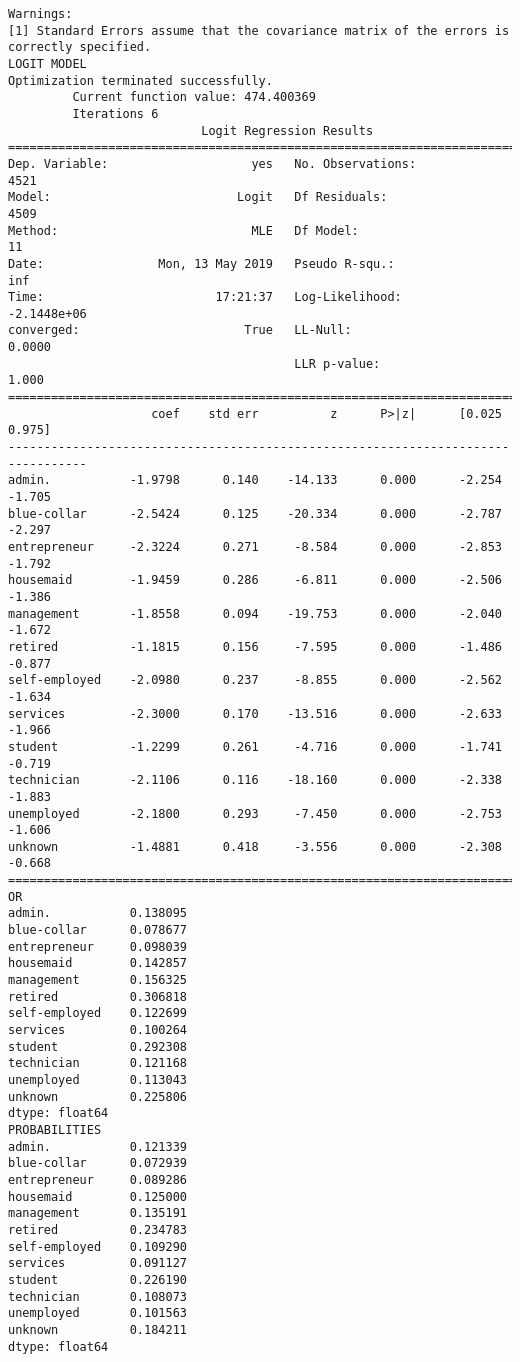 \documentclass[11pt]{article}
\begin{document}
\begin{Verbatim}[commandchars=\\\{\}]
Warnings:
[1] Standard Errors assume that the covariance matrix of the errors is correctly specified.
LOGIT MODEL
Optimization terminated successfully.
         Current function value: 474.400369
         Iterations 6
                           Logit Regression Results                           
==============================================================================
Dep. Variable:                    yes   No. Observations:                 4521
Model:                          Logit   Df Residuals:                     4509
Method:                           MLE   Df Model:                           11
Date:                Mon, 13 May 2019   Pseudo R-squ.:                     inf
Time:                        17:21:37   Log-Likelihood:            -2.1448e+06
converged:                       True   LL-Null:                        0.0000
                                        LLR p-value:                     1.000
=================================================================================
                    coef    std err          z      P>|z|      [0.025      0.975]
---------------------------------------------------------------------------------
admin.           -1.9798      0.140    -14.133      0.000      -2.254      -1.705
blue-collar      -2.5424      0.125    -20.334      0.000      -2.787      -2.297
entrepreneur     -2.3224      0.271     -8.584      0.000      -2.853      -1.792
housemaid        -1.9459      0.286     -6.811      0.000      -2.506      -1.386
management       -1.8558      0.094    -19.753      0.000      -2.040      -1.672
retired          -1.1815      0.156     -7.595      0.000      -1.486      -0.877
self-employed    -2.0980      0.237     -8.855      0.000      -2.562      -1.634
services         -2.3000      0.170    -13.516      0.000      -2.633      -1.966
student          -1.2299      0.261     -4.716      0.000      -1.741      -0.719
technician       -2.1106      0.116    -18.160      0.000      -2.338      -1.883
unemployed       -2.1800      0.293     -7.450      0.000      -2.753      -1.606
unknown          -1.4881      0.418     -3.556      0.000      -2.308      -0.668
=================================================================================
OR
admin.           0.138095
blue-collar      0.078677
entrepreneur     0.098039
housemaid        0.142857
management       0.156325
retired          0.306818
self-employed    0.122699
services         0.100264
student          0.292308
technician       0.121168
unemployed       0.113043
unknown          0.225806
dtype: float64
PROBABILITIES
admin.           0.121339
blue-collar      0.072939
entrepreneur     0.089286
housemaid        0.125000
management       0.135191
retired          0.234783
self-employed    0.109290
services         0.091127
student          0.226190
technician       0.108073
unemployed       0.101563
unknown          0.184211
dtype: float64

    \end{Verbatim}
\end{document}

